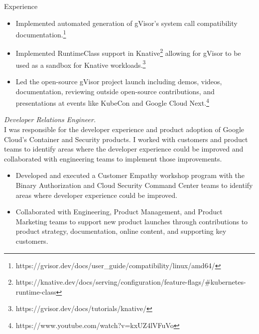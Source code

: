 \documentclass{resume}
\begin{document}
\begin{category}{Experience}
\begin{itemize}
\begin{itemize}
            \item Implemented automated generation of gVisor's system call
                compatibility
                documentation.\footnote{https://gvisor.dev/docs/user\_guide/compatibility/linux/amd64/}

            \item Implemented RuntimeClass support in
                Knative\footnote{https://knative.dev/docs/serving/configuration/feature-flags/\#kubernetes-runtime-class}
                allowing for gVisor to be used as a sandbox for Knative
                workloads.\footnote{https://gvisor.dev/docs/tutorials/knative/}

            \item Led the open-source gVisor project launch including demos,
                videos, documentation, reviewing outside open-source
                contributions, and presentations at events like KubeCon and
                Google Cloud
                Next.\footnote{https://www.youtube.com/watch?v=kxUZ4lVFuVo}

        \end{itemize}

    \end{itemize}

    \begin{itemize}

         \emph{Developer Relations Engineer.}\\
            I was responsible for the developer experience and product adoption
            of Google Cloud's Container and Security products. I worked with
            customers and product teams to identify areas where the developer
            experience could be improved and collaborated with engineering teams
            to implement those improvements.

        \begin{itemize}

            \item Developed and executed a Customer Empathy workshop program
                with the Binary Authorization and Cloud Security Command Center
                teams to identify areas where developer experience could be
                improved.

            \item Collaborated with Engineering, Product Management, and Product
                Marketing teams to support new product launches through
                contributions to product strategy, documentation, online content,
                and supporting key customers.


\end{itemize}
\end{itemize}
\end{category}
\end{document}
